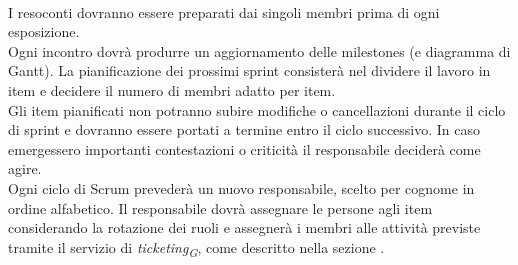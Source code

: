 \documentclass[a4paper, 12pt]{article}
\begin{document}
\paragraph{} I resoconti dovranno essere preparati dai singoli membri prima di ogni esposizione.\\ Ogni incontro dovrà produrre un aggiornamento delle milestones (e diagramma di Gantt). La pianificazione dei prossimi sprint consisterà nel dividere il lavoro in item e decidere il
numero di membri adatto per item. \\
\indent Gli item pianificati non potranno subire modifiche o cancellazioni durante il ciclo di sprint e dovranno essere portati a termine entro il ciclo successivo.
In caso emergessero importanti contestazioni o criticità il responsabile deciderà
come agire.\\
\indent Ogni ciclo di Scrum prevederà un nuovo responsabile, scelto per cognome in ordine alfabetico. Il responsabile dovrà assegnare le persone agli item considerando la
rotazione dei ruoli e assegnerà i membri alle attività previste tramite il
servizio di \textit{ticketing\textsubscript{G}}, come descritto nella sezione . \\
\end{document}

